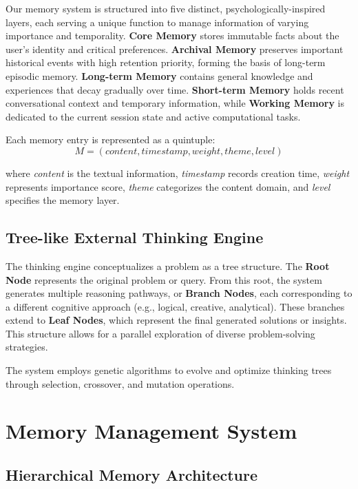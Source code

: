 \documentclass[letterpaper]{article} %
\begin{document}
Our memory system is structured into five distinct, psychologically-inspired layers, each serving a unique function to manage information of varying importance and temporality. {\bfseries Core Memory} stores immutable facts about the user's identity and critical preferences. {\bfseries Archival Memory} preserves important historical events with high retention priority, forming the basis of long-term episodic memory. {\bfseries Long-term Memory} contains general knowledge and experiences that decay gradually over time. {\bfseries Short-term Memory} holds recent conversational context and temporary information, while {\bfseries Working Memory} is dedicated to the current session state and active computational tasks.

Each memory entry is represented as a quintuple:
\begin{equation}
M = (content, timestamp, weight, theme, level)
\end{equation}

where \emph{content} is the textual information, \emph{timestamp} records creation time, \emph{weight} represents importance score, \emph{theme} categorizes the content domain, and \emph{level} specifies the memory layer.

\subsection{Tree-like External Thinking Engine}

The thinking engine conceptualizes a problem as a tree structure. The {\bfseries Root Node} represents the original problem or query. From this root, the system generates multiple reasoning pathways, or {\bfseries Branch Nodes}, each corresponding to a different cognitive approach (e.g., logical, creative, analytical). These branches extend to {\bfseries Leaf Nodes}, which represent the final generated solutions or insights. This structure allows for a parallel exploration of diverse problem-solving strategies.

The system employs genetic algorithms to evolve and optimize thinking trees through selection, crossover, and mutation operations.

\section{Memory Management System}

\subsection{Hierarchical Memory Architecture}
\end{document}
